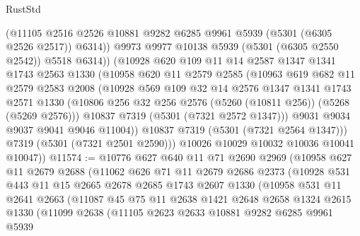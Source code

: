 \begin{lexlean}{RustStd}
\begin{coremodule}
                (@11105
                  @2516
                  @2526
                  @10881
                  @9282
                  @6285
                  @9961
                  @5939
                  (@5301 (@6305 @2526 @2517))
                  @6314))
              @9973
              @9977
              @10138
              @5939
              (@5301 (@6305 @2550 @2542))
              @5518
              @6314))
          (@10928
            @620
            @109
            @11
            @14
            @2587
            @1347
            @1341
            @1743
            @2563
            @1330
            (@10958
              @620
              @11
              @2579
              @2585
              (@10963
                @619
                @682
                @11
                @2579
                @2583
                @2008
                (@10928
                  @569
                  @109
                  @32
                  @14
                  @2576
                  @1347
                  @1341
                  @1743
                  @2571
                  @1330
                  (@10806 @256 @32 @256 @2576 (@5260 (@10811 @256)) (@5268 (@5269 @2576)))
                  @10837
                  @7319
                  (@5301 (@7321 @2572 @1347)))
                @9031
                @9034
                @9037
                @9041
                @9046
                @11004))
            @10837
            @7319
            (@5301 (@7321 @2564 @1347)))
          @7319
          (@5301 (@7321 @2501 @2590)))
        @10026
        @10029
        @10032
        @10036
        @10041
        @10047))
@11574 := @10776
    @627
    @640
    @11
    @71
    @2690
    @2969
    (@10958
      @627
      @11
      @2679
      @2688
      (@11062
        @626
        @71
        @11
        @2679
        @2686
        @2373
        (@10928
          @531
          @443
          @11
          @15
          @2665
          @2678
          @2685
          @1743
          @2607
          @1330
          (@10958
            @531
            @11
            @2641
            @2663
            (@11087
              @45
              @75
              @11
              @2638
              @1421
              @2648
              @2658
              @1324
              @2615
              @1330
              (@11099
                @2638
                (@11105
                  @2623
                  @2633
                  @10881
                  @9282
                  @6285
                  @9961
                  @5939

\end{coremodule}
\end{lexlean}
